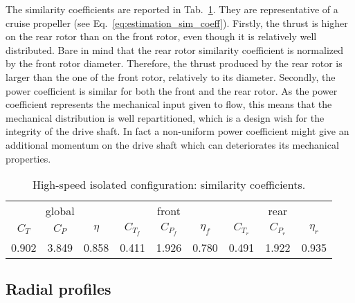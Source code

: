 The similarity coefficients are reported in 
Tab.~\ref{tab:dream_HS_sim_coeff}. 
They are representative of a cruise
propeller (see Eq.~\eqref{eq:estimation_sim_coeff}). 
Firstly, the thrust is higher
on the rear rotor than on the front rotor, even though it is
relatively well distributed. Bare in mind that the rear rotor
similarity coefficient is normalized by the front rotor diameter. Therefore, 
the thrust produced by the rear rotor is larger than the one of the front rotor, 
relatively to its diameter. 
Secondly, the power coefficient is similar for both the front and the
rear rotor. As the power coefficient represents the mechanical input
given to flow, this means that the mechanical distribution is 
well repartitioned, which is a design wish for the integrity of
the drive shaft. In fact a non-uniform power coefficient
might give an additional momentum on the drive shaft which can
deteriorates its mechanical properties.
\begin{table}[htp]
   \centering
  \begin{tabular}{ccc||ccc|ccc}
    \toprule
    \multicolumn{3}{c||}{global} & \multicolumn{3}{c|}{front} & \multicolumn{3}{c}{rear} \\
    $C_T$ & $C_P$ & $\eta$ & $C_{T_f}$ & $C_{P_f}$ & $\eta_f$ & $C_{T_r}$ & $C_{P_r}$ & $\eta_r$ \\
    \midrule
    0.902 & 3.849 & 0.858 & 0.411 & 1.926 & 0.780 & 0.491 & 1.922 & 0.935 \\
    \bottomrule
  \end{tabular}
  \caption{High-speed isolated configuration: similarity coefficients.}
  \label{tab:dream_HS_sim_coeff}
\end{table}

\subsection{Radial profiles}
\label{sub:dream_hs_radial_profiles}

